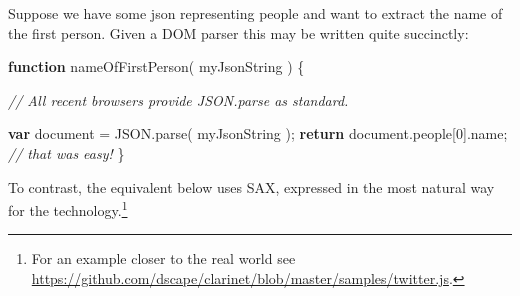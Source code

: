 \documentclass[]{article}
\newenvironment{Shaded}{}{}
\newcommand{\KeywordTok}[1]{\textcolor[rgb]{0.00,0.44,0.13}{\textbf{{#1}}}}
\newcommand{\DecValTok}[1]{\textcolor[rgb]{0.25,0.63,0.44}{{#1}}}
\newcommand{\CommentTok}[1]{\textcolor[rgb]{0.38,0.63,0.69}{\textit{{#1}}}}
\newcommand{\OtherTok}[1]{\textcolor[rgb]{0.00,0.44,0.13}{{#1}}}
\newcommand{\FunctionTok}[1]{\textcolor[rgb]{0.02,0.16,0.49}{{#1}}}
\newcommand{\NormalTok}[1]{{#1}}
\begin{document}
Suppose we have some json representing people and want to extract the
name of the first person. Given a DOM parser this may be written quite
succinctly:

\begin{Shaded}
\begin{Highlighting}[]
\KeywordTok{function} \FunctionTok{nameOfFirstPerson}\NormalTok{( myJsonString ) \{}

   \CommentTok{// All recent browsers provide JSON.parse as standard. }

   \KeywordTok{var} \NormalTok{document = }\OtherTok{JSON}\NormalTok{.}\FunctionTok{parse}\NormalTok{( myJsonString );}
   \KeywordTok{return} \OtherTok{document}\NormalTok{.}\FunctionTok{people}\NormalTok{[}\DecValTok{0}\NormalTok{].}\FunctionTok{name}\NormalTok{; }\CommentTok{// that was easy!}
\NormalTok{\}}
\end{Highlighting}
\end{Shaded}

To contrast, the equivalent below uses SAX, expressed in the most
natural way for the technology.\footnote{For an example closer to the
  real world see
  \url{https://github.com/dscape/clarinet/blob/master/samples/twitter.js}.}
\end{document}
